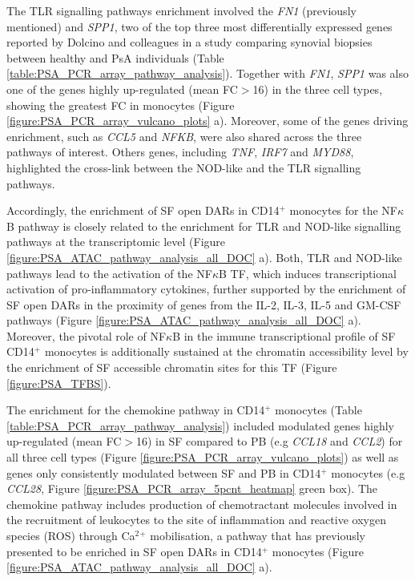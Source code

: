 The TLR signalling pathways enrichment involved the \textit{FN1} (previously mentioned) and \textit{SPP1}, two of the top three most differentially expressed genes reported by Dolcino and colleagues in a study comparing synovial biopsies between healthy and PsA individuals \parencite{Dolcino2015} (Table \ref{table:PSA_PCR_array_pathway_analysis}). Together with \textit{FN1}, \textit{SPP1} was also one of the genes highly up-regulated (mean FC$>$16) in the three cell types, showing the greatest FC in monocytes (Figure \ref{figure:PSA_PCR_array_vulcano_plots} a). Moreover, some of the genes driving enrichment, such as \textit{CCL5} and \textit{NFKB}, were also shared across the three pathways of interest. Others genes, including \textit{TNF}, \textit{IRF7} and \textit{MYD88}, highlighted the cross-link between the NOD-like and the TLR signalling pathways. 

Accordingly, the enrichment of SF open DARs in CD14$^+$ monocytes for the NF$\kappa$B pathway is closely related to the enrichment for TLR and NOD-like signalling pathways at the transcriptomic level (Figure \ref{figure:PSA_ATAC_pathway_analysis_all_DOC} a). Both, TLR and NOD-like pathways lead to the activation of the NF$\kappa$B TF, which induces transcriptional activation of pro-inflammatory cytokines, further supported by the enrichment of SF open DARs in the proximity of genes from the IL-2, IL-3, IL-5 and GM-CSF pathways (Figure \ref{figure:PSA_ATAC_pathway_analysis_all_DOC} a). Moreover, the pivotal role of NF$\kappa$B in the immune transcriptional profile of SF CD14$^+$ monocytes  is additionally sustained at the chromatin accessibility level by the enrichment of SF accessible chromatin sites for this TF (Figure \ref{figure:PSA_TFBS}).  

The enrichment for the chemokine pathway in CD14$^+$ monocytes (Table \ref{table:PSA_PCR_array_pathway_analysis}) included modulated genes highly up-regulated (mean FC$>$16) in SF compared to PB (e.g \textit{CCL18} and \textit{CCL2}) for all three cell types (Figure \ref{figure:PSA_PCR_array_vulcano_plots}) as well as genes only consistently modulated between SF and PB in CD14$^+$ monocytes (e.g \textit{CCL28}, Figure \ref{figure:PSA_PCR_array_5pcnt_heatmap} green box). The chemokine pathway includes production of chemotractant molecules involved in the recruitment of leukocytes to the site of inflammation and reactive oxygen species (ROS) through Ca$^2$$^+$ mobilisation, a pathway that has previously presented to be enriched in SF open DARs in CD14$^+$ monocytes (Figure \ref{figure:PSA_ATAC_pathway_analysis_all_DOC} a).

